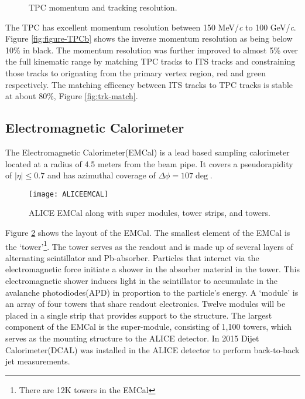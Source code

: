 \begin{figure}[h]
   \centering
   \caption{TPC momentum and tracking resolution\cite{Abelev:2014ffa}.}
   \label{fig:multipart-TPC}
\end{figure}

\noindent
The TPC has excellent momentum resolution between 150 MeV/\textit{c} to 100 GeV/\textit{c}\cite{LIPPMANN2012434}.  Figure \ref{fig:figure-TPCb} shows the inverse momentum resolution as being below 10\% in black.  The momentum resolution was further improved to almost 5\% over the full kinematic range by matching TPC tracks to ITS tracks and constraining those tracks to orignating from the primary vertex region, red and green respectively.  The matching efficency between ITS tracks to TPC tracks is stable at about 80\%, Figure \ref{fig:trk-match}.




\subsection{Electromagnetic Calorimeter}
The Electromagnetic Calorimeter(EMCal)\cite{1742-6596-293-1-012043} is a lead based sampling calorimeter located at a radius of 4.5 meters from the beam pipe.  It covers a pseudorapidity of $ \left | \eta \right | \leq 0.7$ and has azimuthal coverage of $ \Delta \phi = 107 \deg$.

\begin{figure}[h]
\texttt{[image: ALICEEMCAL]}
\centering
\caption{ALICE EMCal along with super modules, tower strips, and towers\cite{1742-6596-110-3-032006}.}
\label{fig:EMCal}
\end{figure}

\noindent
Figure \ref{fig:EMCal} shows the layout of the EMCal.  The smallest element of the EMCal is the `tower'\footnote{There are 12K towers in the EMCal}.  The tower serves as the readout and is made up of several layers of alternating scintillator and Pb-absorber.  Particles that interact via the electromagnetic force initiate a shower in the absorber material in the tower.  This electromagnetic shower induces light in the scintillator  to accumulate in the avalanche photodiodes(APD) in proportion to the particle's energy.  A `module' is an array of four towers that share readout electronics.  Twelve modules will be placed in a single strip that provides support to the structure.  The largest component of the EMCal is the super-module, consisting of 1,100 towers,  which serves as the mounting structure to the ALICE detector.  In 2015 Dijet Calorimeter(DCAL) was installed in the ALICE detector to perform back-to-back jet measurements.



